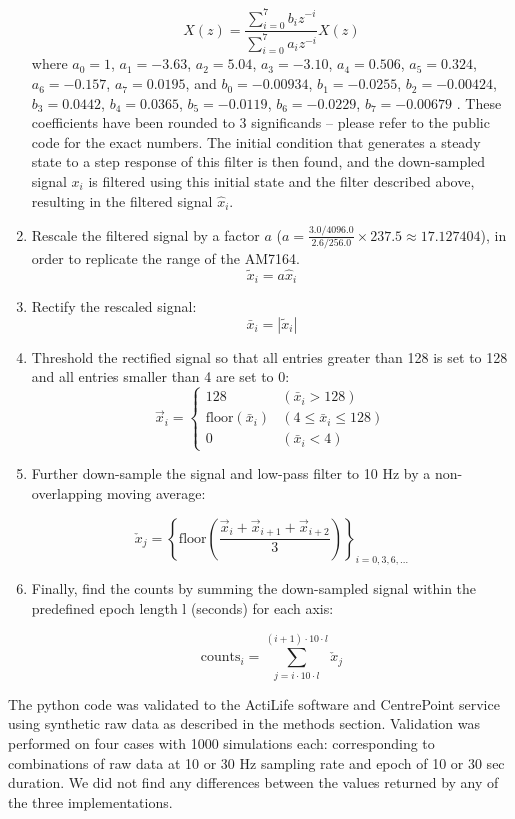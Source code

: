 \documentclass{bmcart}
\begin{document}
\begin{enumerate}
{	$$\hat{X}(z)=\frac{\sum_{i=0}^{7}b_iz^{-i}}{\sum_{i=0}^{7}a_iz^{-i}}X(z)$$
	where $a_0=1$,	$a_1=-3.63$, $a_2=5.04$, $a_3=-3.10$, $a_4=0.506$,
	$a_5=0.324$, $a_6=-0.157$, $a_7=0.0195$, and $b_0=-0.00934$, $b_1=-0.0255$,
	$b_2=-0.00424$, $b_3=0.0442$, $b_4=0.0365$, $b_5=-0.0119$, $b_6=-0.0229$,
	$b_7=-0.00679$ \cite{tryon_fully_1996}. These coefficients have been rounded to
	3 significands – please refer to the public code for the exact numbers. The
	initial condition that generates a steady state to a step response of this
	filter is then found, and the down-sampled signal $x_i$ is filtered using this
	initial state and the filter described above, resulting in the filtered signal
	$\hat{x}_i$.}
	\item{Rescale the filtered signal by a factor $a$ ($a=\frac{3.0 /
			    4096.0}{2.6 / 256.0} \times 237.5 \approx 17.127404$), in order
	            to replicate the range of the AM7164.
	            $$\tilde{x}_i=a\hat{x}_i$$}
	\item{Rectify the rescaled signal: $$\bar{x}_i =|\tilde{x}_i|$$}
	\item{Threshold the rectified signal so that all entries greater than
	            128 is set to 128 and all entries smaller than 4 are set to 0:
	            \[
		            \overrightarrow{x}_i = \begin{cases}
			            128                       & (\bar{x}_i>128)
			            \\
			            \textrm{floor}(\bar{x}_i) &
			            (4\leq\bar{x}_i\leq128)                           \\
			            0                         & (\bar{x}_i<4)
		            \end{cases}
	            \]
	      }
	\item{Further down-sample the signal and low-pass filter to 10 Hz by a
	non-overlapping moving average:

	$$\check{x}_j=\left\{\textrm{floor}(\frac{\overrightarrow{x}_i+\overrightarrow{
				x}_{i+1}+\overrightarrow{x}_{i+2}}{3})\right\}_{i=0,3,6,\ldots}$$
	}
	\item{Finally, find the counts by summing the down-sampled signal
	            within the predefined epoch length l (seconds) for each axis:

	            $$\textrm{counts}_i=\sum_{j=i\cdot10\cdot l}^{(i+1)\cdot10\cdot l}\check{x}_j$$}

\end{enumerate}

The python code was validated to the ActiLife software and CentrePoint service
using synthetic raw data as described in the methods section. Validation was
performed on four cases with 1000 simulations each: corresponding to
combinations of raw data at 10 or 30 Hz sampling rate and epoch of 10 or 30 sec
duration. We did not find any differences between the values returned by any of
the three implementations.
\end{document}
